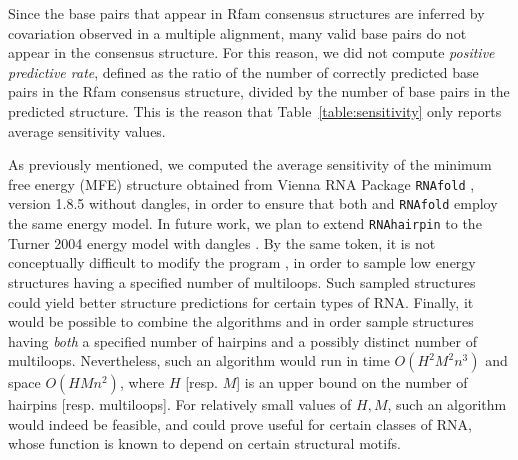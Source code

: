 Since the base pairs that appear in Rfam consensus structures are
inferred by covariation observed in a multiple alignment,
many valid base pairs do not appear in the consensus structure. For
this reason, we did not compute {\em positive predictive rate}, defined
as the ratio of the number of correctly predicted base pairs in the
Rfam consensus structure, divided by the number of base pairs in the
predicted structure. This is the reason that Table~\ref{table:sensitivity}
only reports average sensitivity values.

As previously mentioned, we computed the average sensitivity of
the minimum free energy (MFE) structure obtained from Vienna RNA
Package {\tt RNAfold} \citep{hofacker:ViennaWebServer}, version 1.8.5
without dangles, in order to ensure that both {\rnahairpin} and {\tt RNAfold}
employ the same energy model.  In future work, we plan
to extend {\tt RNAhairpin} to the Turner 2004 energy model with dangles
\citep{Turner.nar09}. By the same token, it is not conceptually difficult
to modify the program {\rnamlnumber}, in order to sample low energy structures
having a specified number of multiloops. Such sampled structures could
yield better structure predictions for certain types of RNA. Finally,
it would be possible to combine the algorithms {\rnahairpin} and {\rnamlnumber}
in order sample structures having {\em both} a specified number of hairpins
and a possibly distinct number of multiloops. Nevertheless, such an
algorithm would run in time $O(H^2 M^2 n^3)$ and space $O(H M n^2)$,
where $H$ [resp. $M$] is an upper bound on the number of hairpins
[resp. multiloops]. For relatively small values of $H,M$, such an
algorithm would indeed be feasible, and could prove useful for certain
classes of RNA, whose function is known to depend on certain structural
motifs.

